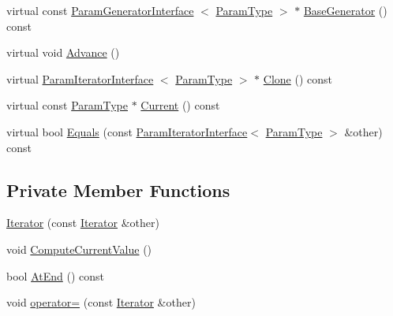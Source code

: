 \begin{DoxyCompactItemize}
\item 
virtual const \*
\hyperlink{classtesting_1_1internal_1_1ParamGeneratorInterface}{\-Param\-Generator\-Interface}\*
$<$ \hyperlink{classtesting_1_1internal_1_1CartesianProductGenerator8_a1323810362151af79d39617fabdcade1}{\-Param\-Type} $>$ $\ast$ \hyperlink{classtesting_1_1internal_1_1CartesianProductGenerator8_1_1Iterator_a297272d14c33d1d5423da2a4776f895b}{\-Base\-Generator} () const 
\item 
virtual void \hyperlink{classtesting_1_1internal_1_1CartesianProductGenerator8_1_1Iterator_aaa5a890708f89affa1a7726cf152c872}{\-Advance} ()
\item 
virtual \hyperlink{classtesting_1_1internal_1_1ParamIteratorInterface}{\-Param\-Iterator\-Interface}\*
$<$ \hyperlink{classtesting_1_1internal_1_1CartesianProductGenerator8_a1323810362151af79d39617fabdcade1}{\-Param\-Type} $>$ $\ast$ \hyperlink{classtesting_1_1internal_1_1CartesianProductGenerator8_1_1Iterator_a4bee4982ee1152c6935ffd0c2d749421}{\-Clone} () const 
\item 
virtual const \hyperlink{classtesting_1_1internal_1_1CartesianProductGenerator8_a1323810362151af79d39617fabdcade1}{\-Param\-Type} $\ast$ \hyperlink{classtesting_1_1internal_1_1CartesianProductGenerator8_1_1Iterator_ab27aeab5db14a30f077a37989ce9261c}{\-Current} () const 
\item 
virtual bool \hyperlink{classtesting_1_1internal_1_1CartesianProductGenerator8_1_1Iterator_a8f18f9a017a12730cce28c07460bbc14}{\-Equals} (const \hyperlink{classtesting_1_1internal_1_1ParamIteratorInterface}{\-Param\-Iterator\-Interface}$<$ \hyperlink{classtesting_1_1internal_1_1CartesianProductGenerator8_a1323810362151af79d39617fabdcade1}{\-Param\-Type} $>$ \&other) const 
\end{DoxyCompactItemize}
\subsection*{\-Private \-Member \-Functions}
\begin{DoxyCompactItemize}
\item 
\hyperlink{classtesting_1_1internal_1_1CartesianProductGenerator8_1_1Iterator_a2b76c2e597bc9393f2b99e869e4fa8d2}{\-Iterator} (const \hyperlink{classtesting_1_1internal_1_1CartesianProductGenerator8_1_1Iterator}{\-Iterator} \&other)
\item 
void \hyperlink{classtesting_1_1internal_1_1CartesianProductGenerator8_1_1Iterator_a4c18cbbef042bab72ed484f5b6923908}{\-Compute\-Current\-Value} ()
\item 
bool \hyperlink{classtesting_1_1internal_1_1CartesianProductGenerator8_1_1Iterator_a6eb9b47ffa4b10f0dca403fc597faba0}{\-At\-End} () const 
\item 
void \hyperlink{classtesting_1_1internal_1_1CartesianProductGenerator8_1_1Iterator_ac087d740f6aa05ec07afd0c5c0327105}{operator=} (const \hyperlink{classtesting_1_1internal_1_1CartesianProductGenerator8_1_1Iterator}{\-Iterator} \&other)
\end{DoxyCompactItemize}
